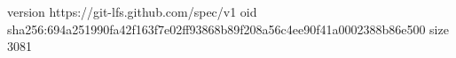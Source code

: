 version https://git-lfs.github.com/spec/v1
oid sha256:694a251990fa42f163f7e02ff93868b89f208a56c4ee90f41a0002388b86e500
size 3081
